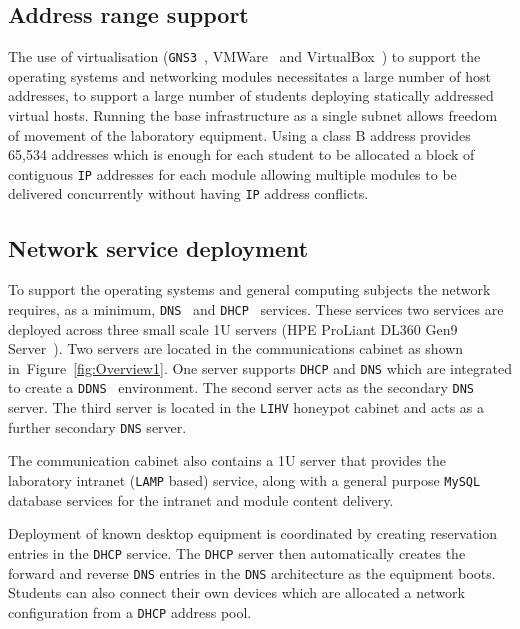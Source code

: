 \subsection{Address range support}

The use of virtualisation (\texttt{GNS3}~\cite{GNS3:17},
VMWare~\cite{VMWARE:17} and VirtualBox~\cite{O:17}) to support the operating
systems and networking modules necessitates a large number of host addresses,
to support a large number of students deploying statically addressed virtual
hosts. Running the base infrastructure as a single subnet allows freedom of
movement of the laboratory equipment. Using a class B address provides 65,534
addresses which is enough for each student to be allocated a block of
contiguous \texttt{IP} addresses for each module allowing multiple modules to
be delivered concurrently without having \texttt{IP} address conflicts.

\subsection{Network service deployment}\label{InfraService}

To support the operating systems and general computing subjects the network
requires, as a minimum, \texttt{DNS}~\cite{RA:11} and
\texttt{DHCP}~\cite{DL:02} services. These services two services are deployed
across three small scale 1U servers (HPE ProLiant DL360 Gen9
Server~\cite{HPE:17}). Two servers are located in the communications cabinet as
shown in~Figure~\ref{fig:Overview1}. One server supports \texttt{DHCP} and
\texttt{DNS} which are integrated to create a \texttt{DDNS}~\cite{SV:06}
environment. The second server acts as the secondary \texttt{DNS} server. The
third server is located in the \texttt{LIHV} honeypot cabinet and acts as a
further secondary \texttt{DNS} server.

The communication cabinet also contains a 1U server that provides the
laboratory intranet (\texttt{LAMP} based) service, along with a general purpose
\texttt{MySQL} database services for the intranet and module content delivery.

Deployment of known desktop equipment is coordinated by creating reservation
entries in the \texttt{DHCP} service. The \texttt{DHCP} server then
automatically creates the forward and reverse \texttt{DNS} entries in the
\texttt{DNS} architecture as the equipment boots. Students can also connect
their own devices which are allocated a network configuration from a
\texttt{DHCP} address pool.


